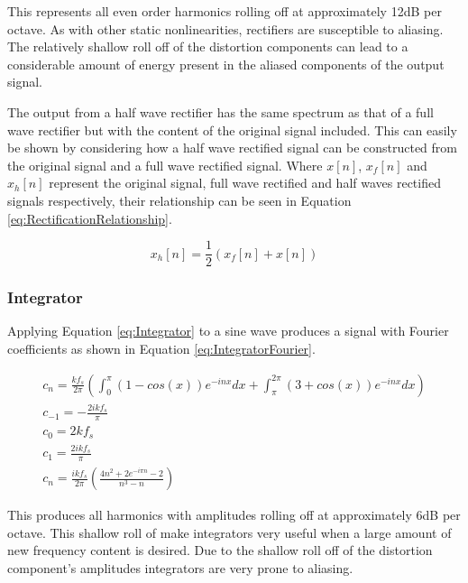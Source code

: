 			This represents all even order harmonics rolling off at approximately 12dB per octave. As with
			other static nonlinearities, rectifiers are susceptible to aliasing. The relatively shallow roll
			off of the distortion components can lead to a considerable amount of energy present in the aliased
			components of the output signal. 

			The output from a half wave rectifier has the same spectrum as that of a full wave rectifier but
			with the content of the original signal included. This can easily be shown by considering how a half
			wave rectified signal can be constructed from the original signal and a full wave rectified signal.
			Where $x[n]$, $x_{f}[n]$ and $x_{h}[n]$ represent the original signal, full wave rectified and half
			waves rectified signals respectively, their relationship can be seen in Equation
			\ref{eq:RectificationRelationship}.

			\begin{equation}
				x_{h}[n] = \frac{1}{2} \left( x_{f}[n] + x[n] \right)
				\label{eq:RectificationRelationship}
			\end{equation}

		\subsubsection*{Integrator}
			Applying Equation \ref{eq:Integrator} to a sine wave produces a signal with Fourier coefficients as
			shown in Equation \ref{eq:IntegratorFourier}.

			\begin{gather}
				c_{n} = \frac{kf_{s}}{2\pi} \left( \int_{0}^{\pi} (1 - cos(x))e^{-inx} dx +
							\int_{\pi}^{2\pi} (3 + cos(x))e^{-inx} dx \right) \nonumber \\
				c_{-1} = - \frac{2ikf_{s}}{\pi} \nonumber \\
				c_{0} = 2kf_{s} \nonumber \\
				c_{1} = \frac{2ikf_{s}}{\pi} \nonumber \\
				c_{n} = \frac{ikf_{s}}{2\pi} \left( \frac{4n^{2} + 2e^{-i\pi n} - 2}{n^{3} - n} \right)
				\label{eq:IntegratorFourier}
			\end{gather}

			This produces all harmonics with amplitudes rolling off at approximately 6dB per octave. This
			shallow roll of make integrators very useful when a large amount of new frequency content is
			desired. Due to the shallow roll off of the distortion component's amplitudes integrators are very
			prone to aliasing.

